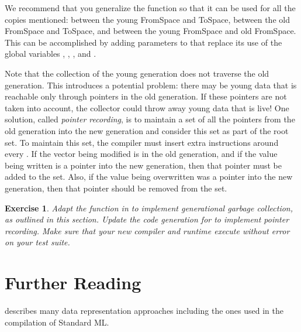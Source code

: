 \documentclass[7x10]{TimesAPriori_MIT}%
\newtheorem{exercise}[theorem]{Exercise}
\numberwithin{theorem}{chapter}
\numberwithin{definition}{chapter}
\numberwithin{equation}{chapter}
\begin{document}
{We recommend that you generalize the  function so that it
can be used for all the copies mentioned: between the young FromSpace
and ToSpace, between the old FromSpace and ToSpace, and between the
young FromSpace and old FromSpace. This can be accomplished by adding
parameters to  that replace its use of the global
variables , ,
, and .

Note that the collection of the young generation does not traverse the
old generation. This introduces a potential problem: there may be
young data that is reachable only through pointers in the old
generation. If these pointers are not taken into account, the
collector could throw away young data that is live!  One solution,
called \emph{pointer recording}, is to maintain a set of all the
pointers from the old generation into the new generation and consider
this set as part of the root set.  To maintain this set, the compiler
must insert extra instructions around every . If the
vector being modified is in the old generation, and if the value being
written is a pointer into the new generation, then that pointer must
be added to the set. Also, if the value being overwritten was a
pointer into the new generation, then that pointer should be removed
from the set.

\begin{exercise}\normalfont\normalsize
  Adapt the  function in  to implement
  generational garbage collection, as outlined in this section.
  Update the code generation for  to implement
  pointer recording. Make sure that your new compiler and runtime
  execute without error on your test suite.
\end{exercise}

\fi}

\section{Further Reading}

\citet{Appel90} describes many data representation approaches
including the ones used in the compilation of Standard ML.
\end{document}
